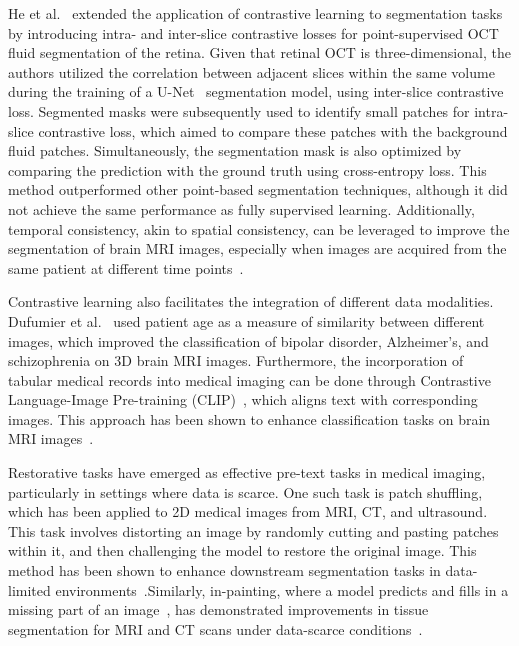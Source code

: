 \documentclass[a4paper,11pt,oneside]{report}
\begin{document}
He et al.~\cite{He2022Intra} extended the application of contrastive learning to segmentation tasks by introducing intra- and inter-slice contrastive losses for point-supervised OCT fluid segmentation of the retina. Given that retinal OCT is three-dimensional, the authors utilized the correlation between adjacent slices within the same volume during the training of a U-Net~\cite{Ronneberger2015} segmentation model, using inter-slice contrastive loss. Segmented masks were subsequently used to identify small patches for intra-slice contrastive loss, which aimed to compare these patches with the background fluid patches. Simultaneously, the segmentation mask is also optimized by comparing the prediction with the ground truth using cross-entropy loss. This method outperformed other point-based segmentation techniques, although it did not achieve the same performance as fully supervised learning. Additionally, temporal consistency, akin to spatial consistency, can be leveraged to improve the segmentation of brain MRI images, especially when images are acquired from the same patient at different time points~\cite{Ren2022}.

Contrastive learning also facilitates the integration of different data modalities. Dufumier et al.~\cite{Dufumier2021} used patient age as a measure of similarity between different images, which improved the classification of bipolar disorder, Alzheimer's, and schizophrenia on 3D brain MRI images. Furthermore, the incorporation of tabular medical records into medical imaging can be done through Contrastive Language-Image Pre-training (CLIP)~\cite{Radford2021CLIP}, which aligns text with corresponding images. This approach has been shown to enhance classification tasks on brain MRI images~\cite{Hager2023}.

Restorative tasks have emerged as effective pre-text tasks in medical imaging, particularly in settings where data is scarce. One such task is patch shuffling, which has been applied to 2D medical images from MRI, CT, and ultrasound. This task involves distorting an image by randomly cutting and pasting patches within it, and then challenging the model to restore the original image. This method has been shown to enhance downstream segmentation tasks in data-limited environments~\cite{Chen2019}.Similarly, in-painting, where a model predicts and fills in a missing part of an image~\cite{Pathak2016}, has demonstrated improvements in tissue segmentation for MRI and CT scans under data-scarce conditions~\cite{Dominic2023}.
\end{document}
